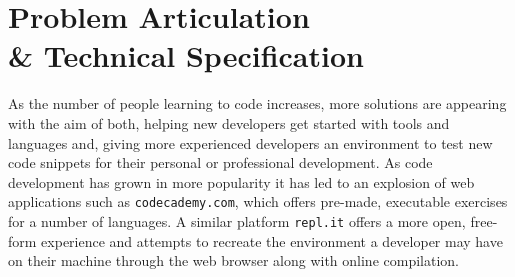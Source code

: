 \chapter{Problem Articulation\\ \& Technical Specification} \label{chapter:probart}
As the number of people learning to code increases, more solutions  are appearing with the aim of both, helping new developers get started with tools and languages and, giving more experienced developers an environment to test new code snippets for their personal or professional development. As code development has grown in more popularity it has led to an explosion of web applications such as \texttt{codecademy.com}, which offers pre-made, executable exercises for a number of languages. A similar platform \texttt{repl.it} offers a more open, free-form experience and attempts to recreate the environment a developer may have on their machine through the web browser along with online compilation.

